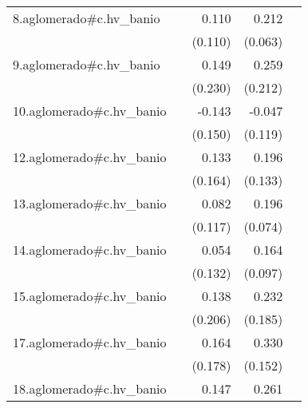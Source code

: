 {\begin{longtable}{l*{4}{D{.}{.}{-1}}}
\addlinespace
8.aglomerado#c.hv\_banio&                     &       0.110         &       0.212\sym{***}&                     \\
            &                     &     (0.110)         &     (0.063)         &                     \\
\addlinespace
9.aglomerado#c.hv\_banio&                     &       0.149         &       0.259         &                     \\
            &                     &     (0.230)         &     (0.212)         &                     \\
\addlinespace
10.aglomerado#c.hv\_banio&                     &      -0.143         &      -0.047         &                     \\
            &                     &     (0.150)         &     (0.119)         &                     \\
\addlinespace
12.aglomerado#c.hv\_banio&                     &       0.133         &       0.196         &                     \\
            &                     &     (0.164)         &     (0.133)         &                     \\
\addlinespace
13.aglomerado#c.hv\_banio&                     &       0.082         &       0.196\sym{**} &                     \\
            &                     &     (0.117)         &     (0.074)         &                     \\
\addlinespace
14.aglomerado#c.hv\_banio&                     &       0.054         &       0.164         &                     \\
            &                     &     (0.132)         &     (0.097)         &                     \\
\addlinespace
15.aglomerado#c.hv\_banio&                     &       0.138         &       0.232         &                     \\
            &                     &     (0.206)         &     (0.185)         &                     \\
\addlinespace
17.aglomerado#c.hv\_banio&                     &       0.164         &       0.330\sym{*}  &                     \\
            &                     &     (0.178)         &     (0.152)         &                     \\
\addlinespace
18.aglomerado#c.hv\_banio&                     &       0.147         &       0.261\sym{***}&                     \\

\end{longtable}}
